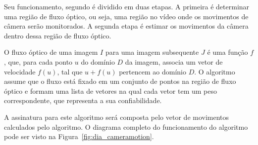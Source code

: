 Seu funcionamento, segundo  é dividido em duas etapas. A primeira é determinar uma região de fluxo óptico, ou seja, uma região no vídeo onde os movimentos de câmera serão monitorados. A segunda etapa é estimar os movimentos da câmera dentro dessa região de fluxo óptico.

O fluxo óptico de uma imagem $I$ para uma imagem subsequente $J$ é uma função $f$, que, para cada ponto $u$ do domínio $D$ da imagem, associa um vetor de velocidade $f(u)$, tal que $u + f(u)$ pertencem ao domínio $D$. O algoritmo assume que o fluxo está fixado em um conjunto de pontos na região de fluxo óptico e formam uma lista de vetores na qual cada vetor tem um peso correspondente, que representa a sua confiabilidade. 









A assinatura para este algoritmo será composta pelo vetor de movimentos calculados pelo algoritmo. O diagrama completo do funcionamento do algoritmo pode ser visto na Figura~\ref{fig:dia_cameramotion}.

